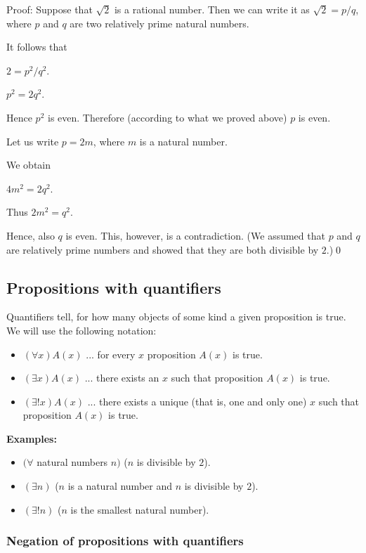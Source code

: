 \documentclass[11pt,paper=b5,footinclude,headinclude]{scrbook} %
\theoremstyle{remark}
\theoremstyle{definition} %
\theoremstyle{theorem} %
\begin{document}
Proof: Suppose that $\sqrt 2$ is a rational number. Then we can write it as $\sqrt 2 = p/q$, where $p$ and $q$ are
two relatively prime natural numbers.

It follows that

$2 = p^2/q^2$.

$p^2 = 2q^2$.

Hence $p^2$ is even. Therefore (according to what we proved above) $p$ is even.

Let us write $p = 2m$, where $m$ is a natural number.

We obtain

$4m^2 = 2q^2$.

Thus
$2m^2 = q^2$.

Hence, also $q$ is even. This, however, is a contradiction. (We assumed that $p$ and $q$ are relatively prime numbers and showed that they are both divisible by $2$.)\qed




\subsection{Propositions with quantifiers}
Quantifiers tell, for  how many objects of some kind a given proposition is true.
We will use the following notation:

%
%
%
\begin{itemize}
  \item
  $(\forall x) A(x)$ ... for every $x$ proposition $A(x)$ is true.
  \item
  $(\exists  x) A(x)$ ... there exists an $x$ such that proposition $A(x)$ is true.
  \item
  $(\exists!  x) A(x)$ ... there exists a unique (that is, one and only one) $x$ such that proposition $A(x)$ is true.
\end{itemize}

\medskip
\textbf{ Examples:}
\begin{itemize}
  \item
$(\forall$ natural numbers $n)$ ($n$ is divisible by $2$).
  \item
$(\exists n)$ ($n$ is a natural number and $n$ is divisible by $2$).
  \item
$(\exists !n)$ ($n$ is the smallest natural number).
\end{itemize}

\subsubsection{Negation of propositions with quantifiers}
\end{document}

